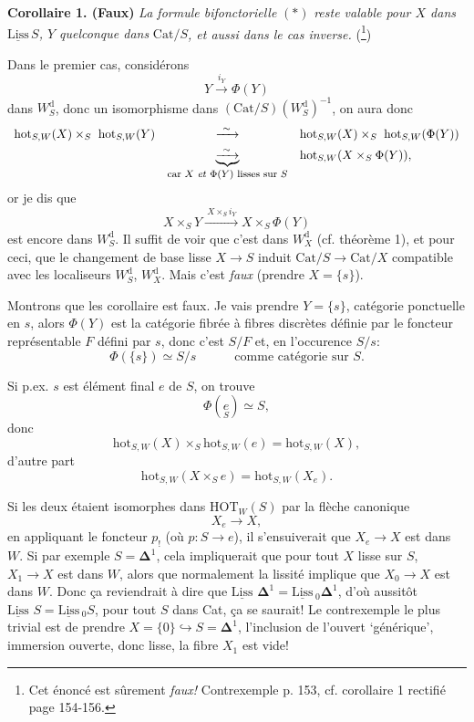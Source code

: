 \documentclass[11pt]{article}
\newcommand{\printedpage}[1]{\marginpar{\footnotesize p.~#1}}
\newcommand{\msp}[1]{\marginpar{\footnotesize [#1]}}
\newcommand{\HOT}{\mathrm{HOT}}
\newcommand{\hot}{\mathrm{hot}}
\newcommand{\Cat}{\mathrm{Cat}}
\newcommand{\Liss}{\underline{\mathrm{Liss}}\,}
\newcommand{\dd}{\mathrm{d}}
\begin{document}
\textbf{Corollaire 1. (Faux)} \textit{La formule bifonctorielle} $(*)$ \textit{reste valable pour $X$ dans} $\Liss S$\textit{, $Y$ quelconque dans} $\Cat/S$\textit{, et aussi dans le cas inverse.} (\footnote[73]{Cet énoncé est sûrement \textit{faux!} Contrexemple p. 153, cf. corollaire 1 rectifié page 154-156.})

Dans le premier cas, considérons
\[
Y \xrightarrow{i_Y} \Phi(Y)
\]
dans $W^{\dd}_S$, donc un isomorphisme dans $(\Cat/S)(W^{\dd}_S)^{-1}$, on aura donc
\[
\begin{array}{lcl}
\hot_{S,W}(X) \times_S\ \hot_{S,W}(Y) & \xrightarrow{\ \sim\ } & \hot_{S,W}(X) \times_S\ \hot_{S,W}(\Phi(Y)) \\[1ex]
 & \underbrace{\xrightarrow{\ \sim\ }}_{\text{\footnotesize car $X$ \textit{et} $\Phi(Y)$ lisses sur $S$}} & \hot_{S,W}(X \times_S \Phi(Y)),
\end{array}
\]
or je dis que
\[
X \times_S Y \xrightarrow{\ X\times_S i_Y\ } X \times_S \Phi(Y)
\]
est encore dans $W^{\dd}_S$. Il suffit de voir que c'est dans $W^{\dd}_X$ (cf. théorème 1), et pour ceci, que le changement de base lisse $X \longrightarrow S$ induit $\Cat/S \longrightarrow \Cat/X$ compatible avec les localiseurs $W^{\dd}_S$, $W^{\dd}_X$. Mais c'est \textit{faux} (prendre $X = \{s\}$).

\msp{page 153}
Montrons que les corollaire est faux. Je vais prendre $Y = \{s\}$, catégorie ponctuelle en $s$, alors $\Phi(Y)$ est la catégorie fibrée à fibres discrètes définie par le foncteur représentable $F$ défini par $s$, donc c'est $S/F$ et, en l'occurence $S/s$: %
\[
\Phi(\{s\}) \simeq S/s \qquad\quad \text{comme catégorie sur } S.
\]


\printedpage{94}
Si p.ex. $s$ est élément final $e$ de $S$, on trouve
\[\Phi(\underset{S}{e}) \simeq S,\]
donc
\[\hot_{S,W}(X)\times_S \hot_{S,W}(e)=\hot_{S,W}(X),\]
d'autre part
\[\hot_{S,W}(X\times_S e)=\hot_{S,W}(X_e).\]

\msp{154}
Si les deux étaient isomorphes dans $\HOT_W(S)$ par la flèche canonique
\[X_e\longrightarrow X,\]
en appliquant le foncteur $p_!$ (où $p : S\longrightarrow e$), il s'ensuiverait que $X_e\longrightarrow X$ est dans $W$. Si par exemple $S=\mathbf{\Delta}^1$, cela impliquerait que pour tout $X$ lisse sur $S$, $X_1\longrightarrow X$ est dans $W$, alors que normalement la lissité implique que $X_0\longrightarrow X$ est dans $W$. Donc ça reviendrait à dire que $\Liss\,\mathbf{\Delta}^1=\Liss_0\mathbf{\Delta}^1$, d'où aussitôt $\Liss\,S=\Liss_0S$, pour tout $S$ dans Cat, ça se saurait! Le contrexemple le plus trivial est de prendre $X=\{0\}\hookrightarrow S=\mathbf{\Delta}^1$, l'inclusion de l'ouvert ‘générique’, immersion ouverte, donc lisse, la fibre $X_1$ est vide! %
\end{document}

